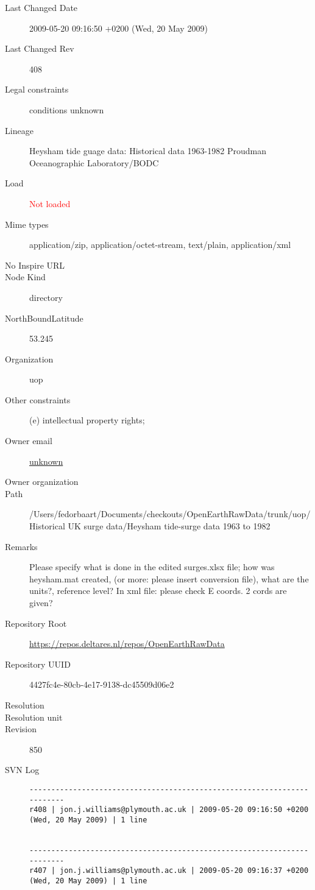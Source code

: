\documentclass[9]{report}
\begin{document}
\begin{description}
  \item[Last Changed Date] 2009-05-20 09:16:50 +0200 (Wed, 20 May 2009)
  \item[Last Changed Rev] 408
  \item[Legal constraints] conditions unknown
  \item[Lineage] Heysham tide guage data: Historical data 1963-1982
Proudman Oceanographic Laboratory/BODC
  \item[Load] \textcolor{red}{Not loaded}
  \item[Mime types] application/zip, application/octet-stream, text/plain, application/xml
  \item[No Inspire URL] 
  \item[Node Kind] directory
  \item[NorthBoundLatitude] 53.245
  \item[Organization] uop
  \item[Other constraints] (e) intellectual property rights;
  \item[Owner email] \href{mailto:unknown}{unknown}
  \item[Owner organization] 
  \item[Path] /Users/fedorbaart/Documents/checkouts/OpenEarthRawData/trunk/uop/Historical UK surge data/Heysham tide-surge data 1963 to 1982
  \item[Remarks] Please specify what is done in the edited surges.xlsx file; how was heysham.mat created, (or more: please insert conversion file), what are the units?, reference level? In xml file: please check E coords. 2 cords are given?
  \item[Repository Root] \href{https://repos.deltares.nl/repos/OpenEarthRawData}{https://repos.deltares.nl/repos/OpenEarthRawData}
  \item[Repository UUID] 4427fc4e-80cb-4e17-9138-dc45509d06e2
  \item[Resolution] 
  \item[Resolution unit] 
  \item[Revision] 850
  \item[SVN Log] \begin{verbatim}
------------------------------------------------------------------------
r408 | jon.j.williams@plymouth.ac.uk | 2009-05-20 09:16:50 +0200 (Wed, 20 May 2009) | 1 line


------------------------------------------------------------------------
r407 | jon.j.williams@plymouth.ac.uk | 2009-05-20 09:16:37 +0200 (Wed, 20 May 2009) | 1 line



\end{verbatim}
\end{description}
\end{document}
